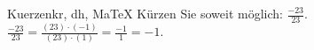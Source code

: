 \begin{MAufgabe}{Kuerzen}{kr, dh, MaTeX}
K\"urzen Sie soweit m\"oglich: $\frac{-23}{23}$.\\ 
\ifLsg\MLoesung
\quad $\frac{-23}{23}=\frac{(23)\cdot(-1)}{(23)\cdot(1)}=\frac{-1}{1}=-1$.\else\relax\fi
 \end{MAufgabe}